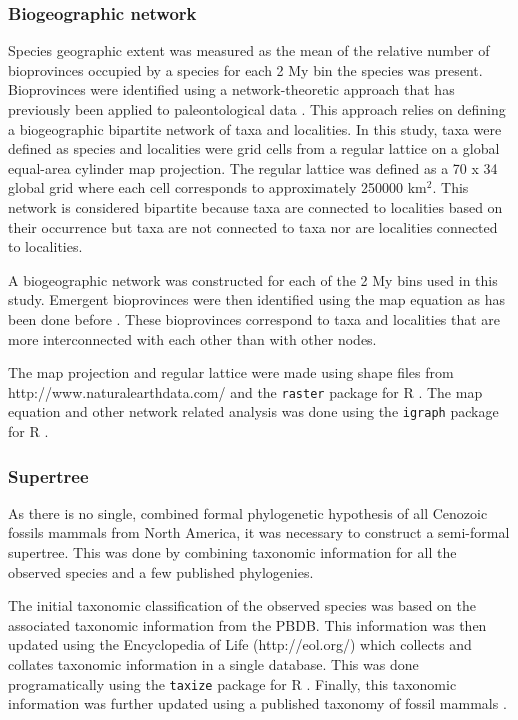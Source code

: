\documentclass{article}
\begin{document}
\subsubsection{Biogeographic network}
Species geographic extent was measured as the mean of the relative number of bioprovinces occupied by a species for each 2 My bin the species was present. Bioprovinces were identified using a network-theoretic approach that has previously been applied to paleontological data \cite{Sidor2013,Vilhena2013}. This approach relies on defining a biogeographic bipartite network of taxa and localities. In this study, taxa were defined as species and localities were grid cells from a regular lattice on a global equal-area cylinder map projection. The regular lattice was defined as a 70 x 34 global grid where each cell corresponds to approximately 250000 km\(^{2}\). This network is considered bipartite because taxa are connected to localities based on their occurrence but taxa are not connected to taxa nor are localities connected to localities.

A biogeographic network was constructed for each of the 2 My bins used in this study. Emergent bioprovinces were then identified using the map equation \cite{Rosvall2008,Rosvall2009a} as has been done before \cite{Sidor2013,Vilhena2013b,Vilhena2013}. These bioprovinces correspond to taxa and localities that are more interconnected with each other than with other nodes.

The map projection and regular lattice were made using shape files from http://www.naturalearthdata.com/ and the \texttt{raster} package for R \cite{raster}. The map equation and other network related analysis was done using the \texttt{igraph} package for R \cite{csardi2006igraph}.


\subsubsection{Supertree}

As there is no single, combined formal phylogenetic hypothesis of all Cenozoic fossils mammals from North America, it was necessary to construct a semi-formal supertree. This was done by combining taxonomic information for all the observed species and a few published phylogenies.

The initial taxonomic classification of the observed species was based on the associated taxonomic information from the PBDB. This information was then updated using the Encyclopedia of Life (http://eol.org/) which collects and collates taxonomic information in a single database. This was done programatically using the \texttt{taxize} package for R \cite{2013taxize}. Finally, this taxonomic information was further updated using a published taxonomy of fossil mammals \cite{Janis2008,Janis1998}. 
\end{document}
